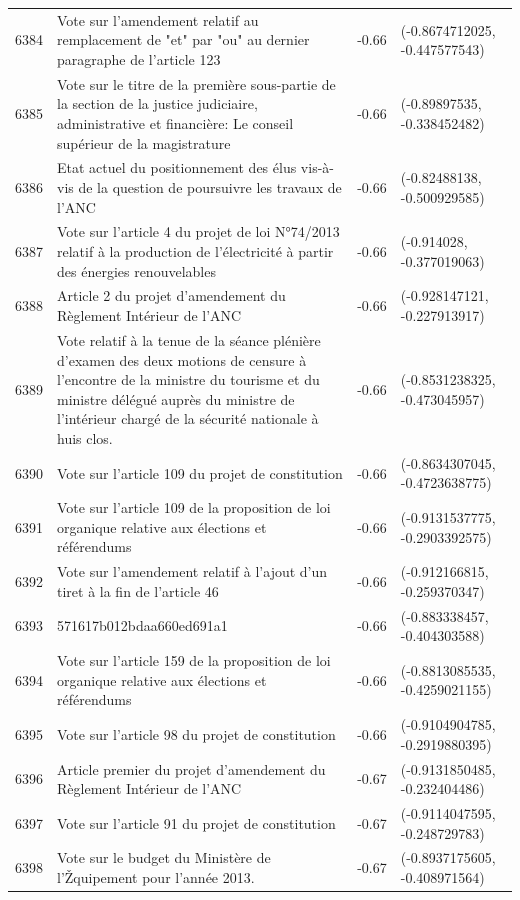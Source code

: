 \begin{table}[ht]
\begin{tabular}{rlrl}
  6384 & Vote sur l'amendement relatif au remplacement de "et" par "ou" au dernier paragraphe de l'article 123 & -0.66 & (-0.8674712025, -0.447577543) \\ 
  6385 & Vote sur le titre de la première sous-partie de la section de la justice judiciaire, administrative et financière: Le conseil supérieur de la magistrature & -0.66 & (-0.89897535, -0.338452482) \\ 
  6386 & Etat actuel du positionnement des élus vis-à-vis de la question de poursuivre les travaux de l'ANC & -0.66 & (-0.82488138, -0.500929585) \\ 
  6387 & Vote sur l'article 4 du projet de loi N°74/2013 relatif à la production de l'électricité à partir des énergies renouvelables & -0.66 & (-0.914028, -0.377019063) \\ 
  6388 & Article 2 du projet d'amendement du Règlement Intérieur de l'ANC & -0.66 & (-0.928147121, -0.227913917) \\ 
  6389 & Vote relatif à la tenue de la séance plénière d'examen des deux motions de censure à l'encontre de la ministre du tourisme et du ministre délégué auprès du ministre de l'intérieur chargé de la sécurité nationale à huis clos. & -0.66 & (-0.8531238325, -0.473045957) \\ 
  6390 & Vote sur l'article 109 du projet de constitution & -0.66 & (-0.8634307045, -0.4723638775) \\ 
  6391 & Vote sur l'article 109 de la proposition de loi organique relative aux élections et référendums & -0.66 & (-0.9131537775, -0.2903392575) \\ 
  6392 & Vote sur l'amendement relatif à l'ajout d'un tiret à la fin de l'article 46 & -0.66 & (-0.912166815, -0.259370347) \\ 
  6393 & 571617b012bdaa660ed691a1 & -0.66 & (-0.883338457, -0.404303588) \\ 
  6394 & Vote sur l'article 159 de la proposition de loi organique relative aux élections et référendums & -0.66 & (-0.8813085535, -0.4259021155) \\ 
  6395 & Vote sur l'article 98 du projet de constitution & -0.66 & (-0.9104904785, -0.2919880395) \\ 
  6396 & Article premier du projet d'amendement du Règlement Intérieur de l'ANC & -0.67 & (-0.9131850485, -0.232404486) \\ 
  6397 & Vote sur l'article 91 du projet de constitution & -0.67 & (-0.9114047595, -0.248729783) \\ 
  6398 & Vote sur le budget du Ministère de l'Žquipement pour l'année 2013. & -0.67 & (-0.8937175605, -0.408971564) \\ 

\end{tabular}
\end{table}
